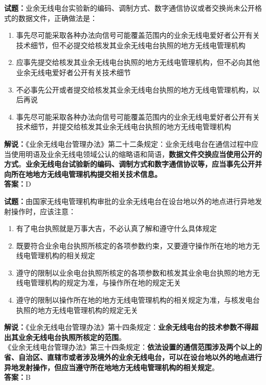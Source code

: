 \documentclass{ctexbook}
\begin{document}
\textbf{试题：}业余无线电台实验新的编码、调制方式、数字通信协议或者交换尚未公开格式的数据文件，正确做法是：
\begin{enumerate}[leftmargin=3em]
  \item 事先尽可能采取各种办法向信号可能覆盖范围内的业余无线电爱好者公开有关技术细节，但不必提交给核发其业余无线电台执照的地方无线电管理机构
  \item 应事先提交给核发其业余无线电台执照的地方无线电管理机构，但不必向其他业余无线电爱好者公开有关技术细节
  \item 不必事先公开或者提交给核发其业余无线电台执照的地方无线电管理机构，以后再说
  \item 事先尽可能采取各种办法向信号可能覆盖范围内的业余无线电爱好者公开有关技术细节，并提交给核发其业余无线电台执照的地方无线电管理机构
\end{enumerate}
\noindent\textbf{解说：}《业余无线电台管理办法》第二十二条规定：业余无线电台在通信过程中应当使用明语及业余无线电领域公认的缩略语和简语，\textbf{数据文件交换应当使用公开的方式}。\textbf{业余无线电台试验新的编码、调制方式和数字通信协议等，应当事先公开并向所在地地方无线电管理机构提交相关技术信息。}\\\noindent\textbf{答案：}D

\vspace{1em}

\textbf{试题：}由国家无线电管理机构审批的业余无线电台在设台地以外的地点进行异地发射操作时，应该注意：
\begin{enumerate}[leftmargin=3em]
  \item 有了电台执照就是万事大吉，不必认真了解和遵守什么具体规定
  \item 既要符合业余电台执照所核定的各项参数约束，又要遵守操作所在地的地方无线电管理机构的相关规定
  \item 遵守的限制以业余电台执照所核定的各项参数和核发其业余电台执照的地方无线电管理机构的规定为准，与操作所在地的规定无关
  \item 遵守的限制以操作所在地的地方无线电管理机构的相关规定为准，与核发电台执照的地方无线电管理机构的规定无关
\end{enumerate}
\noindent\textbf{解说：}《业余无线电台管理办法》第十四条规定：\textbf{业余无线电台的技术参数不得超出其业余无线电台执照所核定的范围}。\\
《业余无线电台管理办法》第三十四条规定：\textbf{依法设置的通信范围涉及两个以上的省、自治区、直辖市或者涉及境外的业余无线电台，可以在设台地以外的地点进行异地发射操作，但应当遵守所在地地方无线电管理机构的相关规定}。\\\noindent\textbf{答案：}B
\end{document}
